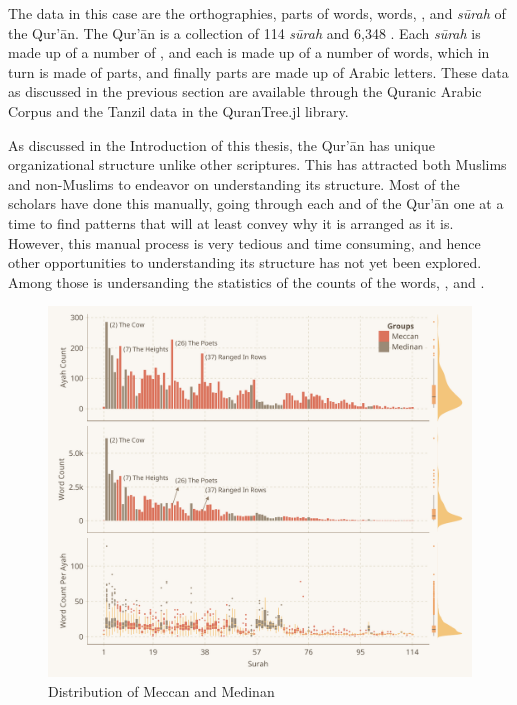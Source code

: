 The data in this case are the orthographies, parts of words, words,  , and \textit{s\=urah}  of the Qur'\=an. The Qur'\=an is a collection of 114 \textit{s\=urah}  and 6,348  . Each \textit{s\=urah}  is made up of a number of  , and each   is made up of a number of words, which in turn is made of parts, and finally parts are made up of Arabic letters. These data as discussed in the previous section are available through the Quranic Arabic Corpus and the Tanzil data in the QuranTree.jl library.

As discussed in the Introduction of this thesis, the Qur'\=an has unique organizational structure unlike other scriptures. This has attracted both Muslims and non-Muslims to endeavor on understanding its structure. Most of the scholars have done this manually, going through each   and   of the Qur'\=an one at a time to find patterns that will at least convey why it is arranged as it is. However, this manual process is very tedious and time consuming, and hence other opportunities to understanding its structure has not yet been explored. Among those is undersanding the statistics of the counts of the words,  , and  . 

\begin{figure}[!t]
    \centering
    \includegraphics[width=\textwidth]{img/plot1.pdf}
    \caption{Distribution of Meccan and Medinan  }
    \label{fig:result_ayah_word_count}
\end{figure}

